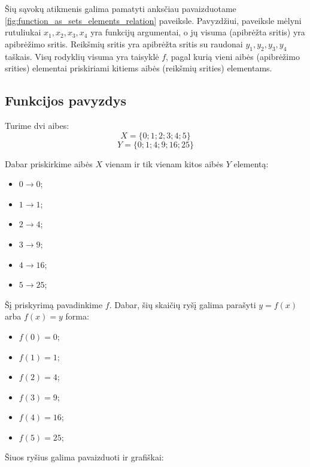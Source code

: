 \documentclass{tufte-handout}
\begin{document}
Šių sąvokų atikmenis galima pamatyti anksčiau pavaizduotame
\ref{fig:function_as_sets_elements_relation} paveiksle. Pavyzdžiui, paveiksle
mėlyni rutuliukai $x_1, x_2, x_3, x_4$ yra funkcijų argumentai, o jų visuma
(apibrėžta sritis) yra apibrėžimo sritis. Reikšmių sritis yra apibrėžta sritis
su raudonai $y_1, y_2, y_3, y_4$ taškais. Visų rodyklių visuma yra taisyklė
$f$, pagal kurią vieni aibės (apibrėžimo srities) elementai priskiriami kitiems
aibės (reikšmių srities) elementams.

\subsection{Funkcijos pavyzdys}\label{sec:function_example}

Turime dvi aibes:
$$X =\{0; 1; 2; 3; 4; 5\}$$
$$Y =\{0; 1; 4; 9; 16; 25\}$$

Dabar priskirkime aibės $X$ vienam ir tik vienam kitos aibės $Y$ elementą:
\begin{itemize}
  \item $0 \rightarrow 0$;
  \item $1 \rightarrow 1$;
  \item $2 \rightarrow 4$;
  \item $3 \rightarrow 9$;
  \item $4 \rightarrow 16$;
  \item $5 \rightarrow 25$;
\end{itemize}

Šį priskyrimą pavadinkime $f$. Dabar, šių skaičių ryšį galima parašyti $y=f(x)$
arba $f(x)=y$  forma:
\begin{itemize}
  \item $f(0) = 0$;
  \item $f(1) = 1$;
  \item $f(2) = 4$;
  \item $f(3) = 9$;
  \item $f(4)= 16$;
  \item $f(5) = 25$;
\end{itemize}

Šiuos ryšius galima pavaizduoti ir grafiškai:
\end{document}
